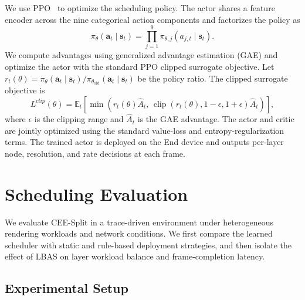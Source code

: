 \documentclass[10pt,journal,compsoc]{IEEEtran}
\begin{document}
We use PPO~\cite{schulman_proximal_2017} to optimize the scheduling policy. The actor shares a feature encoder across the nine categorical action components and factorizes the policy as
\begin{equation}
	\pi_{\theta}(\mathbf{a}_t\mid\mathbf{s}_t)
	=\prod_{j=1}^{9}\pi_{\theta,j}(a_{j,t}\mid\mathbf{s}_t).
	\label{eq:factorized_policy}
\end{equation}
We compute advantages using generalized advantage estimation (GAE) and optimize the actor with the standard PPO clipped surrogate objective. Let $r_t(\theta)=\pi_{\theta}(\mathbf{a}_t\mid\mathbf{s}_t)/ \pi_{\theta_{\mathrm{old}}}(\mathbf{a}_t\mid\mathbf{s}_t)$ be the policy ratio. The clipped surrogate objective is
\begin{equation}
	L^{clip}(\theta)=\mathbb{E}_t\!\left[
	\min\!\left(r_t(\theta)\widehat A_t,\,
	\operatorname{clip}(r_t(\theta),1-\epsilon,1+\epsilon)\widehat A_t\right)
	\right],
	\label{eq:ppo_clip}
\end{equation}
where $\epsilon$ is the clipping range and $\widehat A_t$ is the GAE advantage. The actor and critic are jointly optimized using the standard value-loss and entropy-regularization terms. The trained actor is deployed on the End device and outputs per-layer node, resolution, and rate decisions at each frame.

\section{Scheduling Evaluation}
\label{sec:control_plane}

We evaluate CEE-Split in a trace-driven environment under heterogeneous rendering workloads and network conditions. We first compare the learned scheduler with static and rule-based deployment strategies, and then isolate the effect of LBAS on layer workload balance and frame-completion latency.

\subsection{Experimental Setup}
\label{sec:training_setup}
\end{document}
